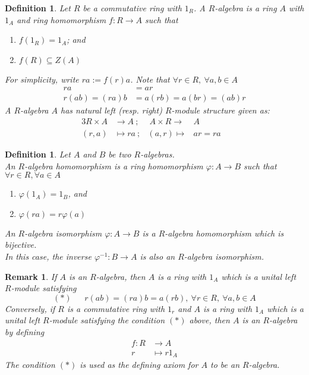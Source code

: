 \documentclass[a4paper,8pt]{article}
\newcommand{\hlt}[1]{\textit{{\color{blue}#1}}}
\theoremstyle{theorem}
\newtheorem{definition}[theorem]{Definition}
\newtheorem{remark}[theorem]{Remark}
\begin{document}
\begin{definition}
Let $R$ be a commutative ring with $1_R$. A \hlt{$R$-algebra} is a ring $A$ with $1_A$ and ring homomorphism $f: R \rightarrow A$ such that
\begin{enumerate}[label=(\roman*)]
\item $f(1_R) = 1_A$; and
\item $f(R) \subseteq Z(A)$
\end{enumerate}
For simplicity, write $ra := f(r)a$.
Note that $\forall r \in R, \ \forall a, b \in A$
\begin{align}
ra &= ar \nonumber \\
r(ab) = (ra)b &= a(rb) = a(br) = (ab)r \nonumber
\end{align}
A $R$-algebra $A$ has natural left (resp. right) $R$-module structure given as:
\begin{alignat}{3}
R \times A &\rightarrow A \ ; &\ A \times R \rightarrow& A& \nonumber \\
(r, a) &\mapsto ra\  ; &(a,r) \mapsto& ar = ra& \nonumber
\end{alignat}
\end{definition}

\begin{definition}
Let $A$ and $B$ be two $R$-algebras.\\
An \hlt{$R$-algebra homomorphism} is a ring homomorphism $\varphi: A \rightarrow B$ such that $\forall r \in R, \forall a \in A$
\begin{enumerate}[label=(\roman*)]
\item $\varphi(1_A) = 1_B$, and
\item $\varphi(ra) = r \varphi(a)$
\end{enumerate}
An \hlt{$R$-algebra isomorphism} $\varphi: A \rightarrow B$ is a $R$-algebra homomorphism which is bijective.\\
In this case, the inverse $\varphi^{-1}: B \rightarrow A$ is also an $R$-algebra isomorphism.
\end{definition}

\begin{remark}
If $A$ is an $R$-algebra, then $A$ is a ring with $1_A$ which is a unital left $R$-module satisfying
\begin{equation}
(*) \ \ \ \ \ \ \ r(ab) = (ra)b = a(rb), \ \forall r\in R, \ \forall a,b \in A \nonumber
\end{equation}
Conversely, if $R$ is a commutative ring with $1_r$ and $A$ is a ring with $1_A$ which is a unital left $R$-module satisfying the condition $(*)$ above, then $A$ is an $R$-algebra by defining
\begin{align}
f: R &\rightarrow A \nonumber \\
r &\mapsto r 1_A \nonumber
\end{align}
The condition $(*)$ is used as the defining axiom for $A$ to be an $R$-algebra.
\end{remark}
\end{document}
